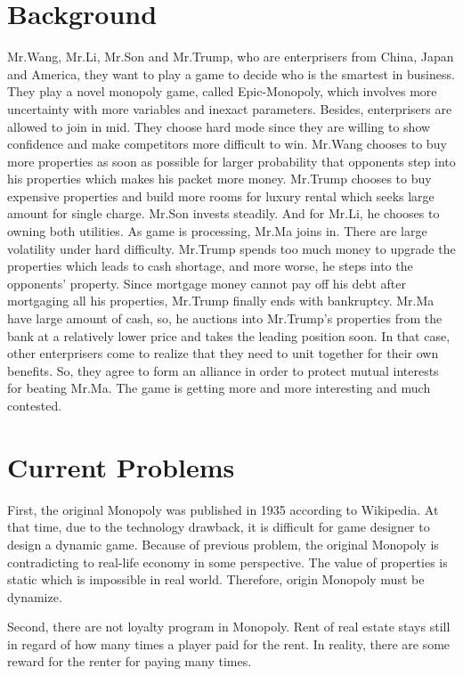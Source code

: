 \documentclass[a4paper,12pt]{article}
\begin{document}
\section{Background}
\lettrine[lines=2,loversize=0.35,lraise=0.07,findent=3pt,nindent=2pt]{M}{}r.Wang, Mr.Li, Mr.Son and Mr.Trump, who are enterprisers from China, Japan and America, they want to play a game to decide who is the smartest in business. They play a novel monopoly game, called Epic-Monopoly, which involves more uncertainty with more variables and inexact parameters. Besides, enterprisers are allowed to join in mid. They choose hard mode since they are willing to show confidence and make competitors more difficult to win. Mr.Wang chooses to buy more properties as soon as possible for larger probability that opponents step into his properties which makes his packet more money. Mr.Trump chooses to buy expensive properties and build more rooms for luxury rental which seeks large amount for single charge. Mr.Son invests steadily. And for Mr.Li, he chooses to owning both utilities. As game is processing, Mr.Ma joins in. There are large volatility under hard difficulty. Mr.Trump spends too much money to upgrade the properties which leads to cash shortage, and more worse, he steps into the opponents' property. Since mortgage money cannot pay off his debt after mortgaging all his properties, Mr.Trump finally ends with bankruptcy. Mr.Ma have large amount of cash, so, he auctions into Mr.Trump's properties from the bank at a relatively lower price and takes the leading position soon. In that case, other enterprisers come to realize that they need to unit together for their own benefits. So, they agree to form an alliance in order to protect mutual interests for beating Mr.Ma. The game is getting more and more interesting and much contested.
\section{Current Problems}
	\lettrine[lines=2,loversize=0.35,lraise=0.07,findent=3pt,nindent=2pt]{F}{}irst, the original Monopoly was published in 1935 according to Wikipedia. At that time, due to the technology drawback, it is difficult for game designer to design a dynamic game. Because of previous problem, the original Monopoly is contradicting to real-life economy in some perspective. The value of properties is static which is impossible in real world. Therefore, origin Monopoly must be dynamize.
	
	Second, there are not loyalty program in Monopoly. Rent of real estate stays still in regard of how many times a player paid for the rent. In reality, there are some reward for the renter for paying many times.
	
\end{document}
